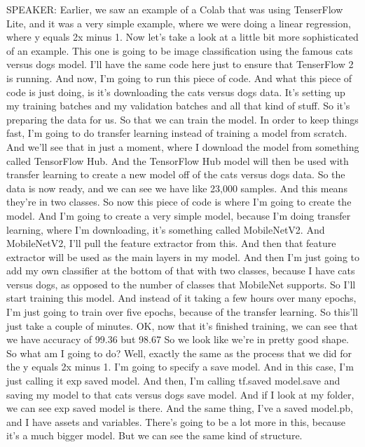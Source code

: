 SPEAKER: Earlier, we saw an example of a Colab that was using TenserFlow Lite,
and it was a very simple example, where we
were doing a linear regression, where y equals 2x minus 1.
Now let's take a look at a little bit more sophisticated of an example.
This one is going to be image classification using
the famous cats versus dogs model.
I'll have the same code here just to ensure that TenserFlow 2 is running.
And now, I'm going to run this piece of code.
And what this piece of code is just doing,
is it's downloading the cats versus dogs data.
It's setting up my training batches and my validation batches
and all that kind of stuff.
So it's preparing the data for us.
So that we can train the model.
In order to keep things fast, I'm going to do transfer learning instead
of training a model from scratch.
And we'll see that in just a moment, where I download the model
from something called TensorFlow Hub.
And the TensorFlow Hub model will then be
used with transfer learning to create a new model off
of the cats versus dogs data.
So the data is now ready, and we can see we have like 23,000 samples.
And this means they're in two classes.
So now this piece of code is where I'm going to create the model.
And I'm going to create a very simple model, because I'm
doing transfer learning, where I'm downloading,
it's something called MobileNetV2.
And MobileNetV2, I'll pull the feature extractor from this.
And then that feature extractor will be used as the main layers in my model.
And then I'm just going to add my own classifier
at the bottom of that with two classes, because I have cats versus dogs,
as opposed to the number of classes that MobileNet supports.
So I'll start training this model.
And instead of it taking a few hours over many epochs,
I'm just going to train over five epochs,
because of the transfer learning.
So this'll just take a couple of minutes.
OK, now that it's finished training, we can
see that we have accuracy of 99.36%
but 98.67%
So we look like we're in pretty good shape.
So what am I going to do?
Well, exactly the same as the process that we did for the y
equals 2x minus 1.
I'm going to specify a save model.
And in this case, I'm just calling it exp saved model.
And then, I'm calling tf.saved model.save
and saving my model to that cats versus dogs save model.
And if I look at my folder, we can see exp saved model is there.
And the same thing, I've a saved model.pb,
and I have assets and variables.
There's going to be a lot more in this, because it's a much bigger model.
But we can see the same kind of structure.
